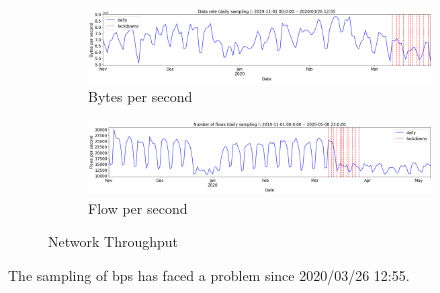 \documentclass[10pt, journal, letterpaper]{IEEEtran}
\newcommand\linearFigSze{0.48}
\begin{document}
\begin{figure}
    \begin{subfigure}{\linearFigSze\textwidth}
          \centering
          \includegraphics[width=\columnwidth]{img/traffic_trend_bps.png}
          \caption{Bytes per second}
          \label{fig:traffic_trend_bps}
    \end{subfigure}
    \begin{subfigure}{\linearFigSze\textwidth}
          \centering
          \includegraphics[width=\columnwidth]{img/traffic_trend_fps.png}
          \caption{Flow per second}
          \label{fig:traffic_trend_fps}
    \end{subfigure}
    \caption{Network Throughput}
    \label{fig:network_throughput}
\end{figure}

The sampling of bps has faced a problem since 2020/03/26 12:55. 
\end{document}
